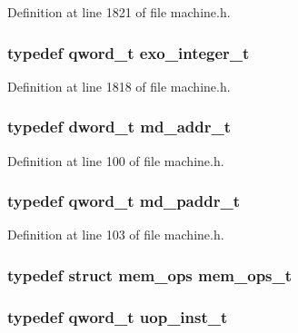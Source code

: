 Definition at line 1821 of file machine.h.
\subsubsection[{exo\_\-integer\_\-t}]{\setlength{\rightskip}{0pt plus 5cm}typedef qword\_\-t {\bf exo\_\-integer\_\-t}}\label{machine_8h_9bc82bf074be97d3b9684417125e9448}




Definition at line 1818 of file machine.h.
\subsubsection[{md\_\-addr\_\-t}]{\setlength{\rightskip}{0pt plus 5cm}typedef {\bf dword\_\-t} {\bf md\_\-addr\_\-t}}\label{machine_8h_fba784f22c1d8233f95c4f4db103018a}




Definition at line 100 of file machine.h.
\subsubsection[{md\_\-paddr\_\-t}]{\setlength{\rightskip}{0pt plus 5cm}typedef qword\_\-t {\bf md\_\-paddr\_\-t}}\label{machine_8h_1283325781575bd7f116553a4cd7efd5}




Definition at line 103 of file machine.h.
\subsubsection[{mem\_\-ops\_\-t}]{\setlength{\rightskip}{0pt plus 5cm}typedef struct {\bf mem\_\-ops} {\bf mem\_\-ops\_\-t}}\label{machine_8h_904a7cc3131f1f73265481e757643649}


\subsubsection[{uop\_\-inst\_\-t}]{\setlength{\rightskip}{0pt plus 5cm}typedef qword\_\-t {\bf uop\_\-inst\_\-t}}\label{machine_8h_48101d661bf0d09982b8eae832f2df44}




